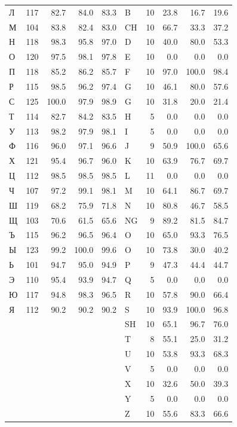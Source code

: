 \documentclass[a4paper,10pt]{article}
\newcommand{\ruT}[1]{{\fontencoding{T2A}\selectfont #1}}
\begin{document}
\begin{table}[H]
\begin{tabular}{lrrrr|lrrrr}
\ruT{Л} & 117 & 82.7 & 84.0 & 83.3 & B & 10 & 23.8 & 16.7 & 19.6 \\
\ruT{М} & 104 & 83.8 & 82.4 & 83.0 & CH & 10 & 66.7 & 33.3 & 37.2 \\
\ruT{Н} & 118 & 98.3 & 95.8 & 97.0 & D & 10 & 40.0 & 80.0 & 53.3 \\
\ruT{О} & 120 & 97.5 & 98.1 & 97.8 & E & 10 & 0.0 & 0.0 & 0.0 \\
\ruT{П} & 118 & 85.2 & 86.2 & 85.7 & F & 10 & 97.0 & 100.0 & 98.4 \\
\ruT{Р} & 115 & 98.5 & 96.2 & 97.4 & G & 10 & 46.1 & 80.0 & 57.6 \\
\ruT{С} & 125 & 100.0 & 97.9 & 98.9 & G\textquotesingle{} & 10 & 31.8 & 20.0 & 21.4 \\
\ruT{Т} & 114 & 82.7 & 84.2 & 83.5 & H & 5 & 0.0 & 0.0 & 0.0 \\
\ruT{У} & 113 & 98.2 & 97.9 & 98.1 & I & 5 & 0.0 & 0.0 & 0.0 \\
\ruT{Ф} & 116 & 96.0 & 97.1 & 96.6 & J & 9 & 50.9 & 100.0 & 65.6 \\
\ruT{Х} & 121 & 95.4 & 96.7 & 96.0 & K & 10 & 63.9 & 76.7 & 69.7 \\
\ruT{Ц} & 112 & 98.5 & 98.5 & 98.5 & L & 11 & 0.0 & 0.0 & 0.0 \\
\ruT{Ч} & 107 & 97.2 & 99.1 & 98.1 & M & 10 & 64.1 & 86.7 & 69.7 \\
\ruT{Ш} & 119 & 68.2 & 75.9 & 71.8 & N & 10 & 80.8 & 46.7 & 58.5 \\
\ruT{Щ} & 103 & 70.6 & 61.5 & 65.6 & NG & 9 & 89.2 & 81.5 & 84.7 \\
\ruT{Ъ} & 115 & 96.2 & 96.5 & 96.4 & O & 10 & 65.0 & 93.3 & 76.5 \\
\ruT{Ы} & 123 & 99.2 & 100.0 & 99.6 & O\textquotesingle{} & 10 & 73.8 & 30.0 & 40.2 \\
\ruT{Ь} & 101 & 94.7 & 95.0 & 94.9 & P & 9 & 47.3 & 44.4 & 44.7 \\
\ruT{Э} & 110 & 95.4 & 93.9 & 94.7 & Q & 5 & 0.0 & 0.0 & 0.0 \\
\ruT{Ю} & 117 & 94.8 & 98.3 & 96.5 & R & 10 & 57.8 & 90.0 & 66.4 \\
\ruT{Я} & 112 & 90.2 & 90.2 & 90.2 & S & 10 & 93.9 & 100.0 & 96.8 \\
 &  &  &  &  & SH & 10 & 65.1 & 96.7 & 76.0 \\
 &  &  &  &  & T & 8 & 55.1 & 25.0 & 31.2 \\
 &  &  &  &  & U & 10 & 53.8 & 93.3 & 68.3 \\
 &  &  &  &  & V & 5 & 0.0 & 0.0 & 0.0 \\
 &  &  &  &  & X & 10 & 32.6 & 50.0 & 39.3 \\
 &  &  &  &  & Y & 5 & 0.0 & 0.0 & 0.0 \\
 &  &  &  &  & Z & 10 & 55.6 & 83.3 & 66.6 \\
\bottomrule
\end{tabular}
\end{table}
\end{document}
